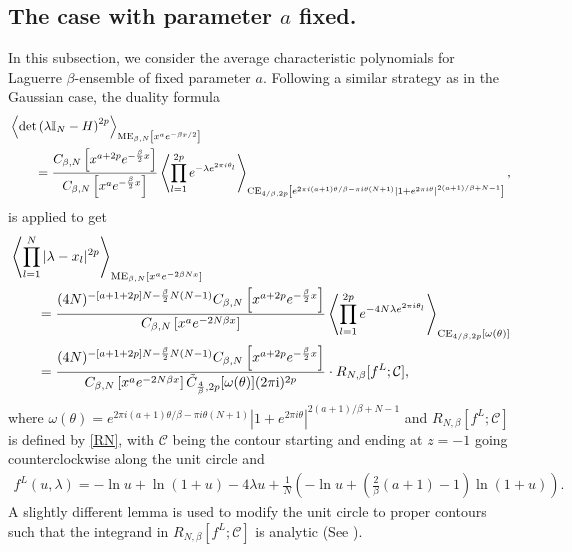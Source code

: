 \documentclass[11pt,a4paper]{article}
\numberwithin{equation}{section} %
\theoremstyle{plain}
\theoremstyle{definition}
\numberwithin{prop}{section}
\numberwithin{cor}{section}
\numberwithin{remark}{section}
\begin{document}
\subsection{The case with parameter $a$ fixed.}
In this subsection, we consider the average characteristic polynomials for Laguerre $\beta$-ensemble of fixed parameter $a$.
Following a similar strategy as in the Gaussian case, the duality formula \cite[eq. (3.14)]{Fo25+}
\begin{align}\label{dualf-L}
 &\left\langle\operatorname{det}\left(\lambda \mathbb{I}_N-H\right)^{2p}\right\rangle_{\mathrm{ME}_{\beta, N}\left[x^a e^{-\beta x / 2}\right]}\nonumber\\
 &\qquad={C_{\beta, N}\left[x^{a+2 p} e^{-\frac{\beta}{2} x}\right]\over C_{\beta, N}\left[x^{a} e^{-\frac{\beta}{2} x}\right]}\left\langle\prod_{l=1}^{2p} e^{-\lambda e^{2 \pi i \theta_l}}\right\rangle_{\mathrm{CE}_{4 / \beta, 2p}\left[e^{2 \pi i(a+1) \theta / \beta-\pi i \theta(N+1)}\left|1+e^{2 \pi i \theta}\right|^{2(a+1) / \beta+N-1}\right]},
\end{align}
is applied to get
\begin{align}
    &\left\langle\prod_{l=1}^N |\lambda-x_l|^{2 p}\right\rangle_{\mathrm{ME}_{\beta, N}\left[x^{a}e^{-2\beta N x}\right]}\nonumber\\
    &\qquad =\frac{(4 N)^{-[a+1+2 p] N-\frac{\beta}{2} N(N-1)}  C_{\beta, N}\left[x^{a+2 p} e^{-\frac{\beta}{2} x}\right]}{C_{\beta, N}\left[x^a e^{-2 N \beta x}\right]}\left\langle\prod_{l=1}^{2p} e^{-4N\lambda e^{2 \pi i \theta_l}}\right\rangle_{\mathrm{CE}_{4 / \beta, 2p}\left[\omega(\theta)\right]}\nonumber\\
    &\qquad=\frac{(4 N)^{-[a+1+2 p] N-\frac{\beta}{2} N(N-1)}  C_{\beta, N}\left[x^{a+2 p} e^{-\frac{\beta}{2} x}\right]}{C_{\beta, N}\left[x^a e^{-2 N \beta x}\right]\tilde{C}_{{4\over\beta},2p}[\omega(\theta)](2\pi\mathrm{i})^{2p}}\cdot R_{N,\beta}[f^{L};\mathcal{C}], \label{eq-RN-L}
\end{align}
where $\omega(\theta)=e^{2 \pi i(a+1) \theta / \beta-\pi i \theta(N+1)}\left|1+e^{2 \pi i \theta}\right|^{2(a+1) / \beta+N-1}$ and $R_{N,\beta}[f^L;\mathcal{C}]$ is defined by \eqref{RN}, with $\mathcal{C}$ being the contour starting and ending at $z=-1$ going counterclockwise along the unit circle and 
\begin{align*}
    f^L(u, \lambda)=-\ln u+\ln (1+u)-4 \lambda u+\frac{1}{N}\left(-\ln u+\left(\frac{2}{\beta}(a+1)-1\right) \ln (1+u)\right).
\end{align*}
A slightly different lemma is used to modify the unit circle to proper contours such that the integrand in $R_{N,\beta}[f^L;\mathcal{C}]$ is analytic (See \cite[Lemma 4]{DF06}).
\end{document}
